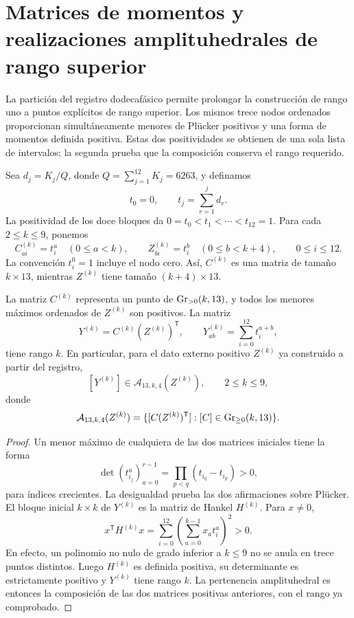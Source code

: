 \section{Matrices de momentos y realizaciones amplituhedrales de rango superior}
\label{sec:higher-rank}
La partición del registro dodecafásico permite prolongar la construcción
de rango uno a puntos explícitos de rango superior. Los mismos trece
nodos ordenados proporcionan simultáneamente menores de Plücker positivos
y una forma de momentos definida positiva. Estas dos positividades se
obtienen de una sola lista de intervalos; la segunda prueba que la
composición conserva el rango requerido.

Sea \(d_j=K_j/Q\), donde \(Q=\sum_{j=1}^{12}K_j=6263\), y definamos
\[
 t_0=0,\qquad t_j=\sum_{r=1}^jd_r.
\]
La positividad de los doce bloques da
\(0=t_0<t_1<\cdots<t_{12}=1\). Para cada \(2\le k\le9\), ponemos
\[
 C^{(k)}_{ai}=t_i^a\quad(0\le a<k),\qquad
 Z^{(k)}_{bi}=t_i^b\quad(0\le b<k+4),\qquad 0\le i\le12.
\]
La convención \(t_i^0=1\) incluye el nodo cero. Así, \(C^{(k)}\)
es una matriz de tamaño \(k\times13\), mientras \(Z^{(k)}\) tiene
tamaño \((k+4)\times13\).

\begin{theorem}
La matriz \(C^{(k)}\) representa un punto de
\(\operatorname{Gr}_{>0}(k,13)\), y todos los menores máximos ordenados de
\(Z^{(k)}\) son positivos. La matriz
\[
 Y^{(k)}=C^{(k)}(Z^{(k)})^{\mathsf T},\qquad
 Y^{(k)}_{ab}=\sum_{i=0}^{12}t_i^{a+b},
\]
tiene rango \(k\). En particular, para el dato externo positivo
\(Z^{(k)}\) ya construido a partir del registro,
\[
 [Y^{(k)}]\in\mathcal A_{13,k,4}(Z^{(k)}),\qquad 2\le k\le9,
\]
donde
\[
 \mathcal A_{13,k,4}(Z^{(k)})
 =\{[C(Z^{(k)})^{\mathsf T}]:[C]\in\operatorname{Gr}_{\ge0}(k,13)\}.
\]
\end{theorem}
\begin{proof}
Un menor máximo de cualquiera de las dos matrices iniciales tiene la forma
\[
 \det(t_{i_j}^{a})_{a=0}^{r-1}
 =\prod_{p<q}(t_{i_q}-t_{i_p})>0,
\]
para índices crecientes. La desigualdad prueba las dos afirmaciones sobre
Plücker. El bloque inicial \(k\times k\) de \(Y^{(k)}\) es la matriz
de Hankel \(H^{(k)}\). Para \(x\ne0\),
\[
 x^{\mathsf T}H^{(k)}x
 =\sum_{i=0}^{12}\left(\sum_{a=0}^{k-1}x_at_i^a\right)^2>0.
\]
En efecto, un polinomio no nulo de grado inferior a \(k\le9\) no se
anula en trece puntos distintos. Luego \(H^{(k)}\) es definida positiva,
su determinante es estrictamente positivo y \(Y^{(k)}\) tiene rango
\(k\). La pertenencia amplituhedral es entonces la composición de las
dos matrices positivas anteriores, con el rango ya comprobado.
\end{proof}

